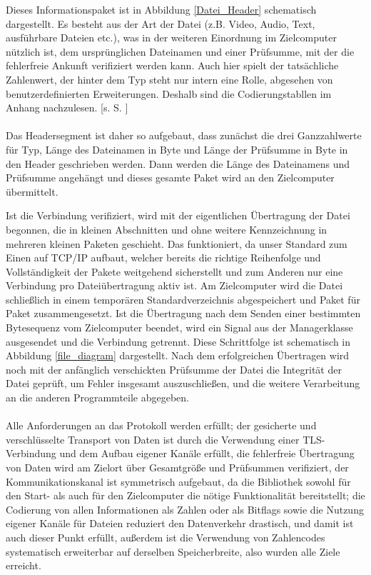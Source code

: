 Dieses Informationspaket ist in Abbildung \ref{Datei_Header} schematisch dargestellt.
Es besteht aus der Art der Datei (z.B. Video, Audio, Text, ausführbare Dateien etc.), was in der weiteren Einordnung im Zielcomputer nützlich ist, dem ursprünglichen Dateinamen und einer Prüfsumme, mit der die fehlerfreie Ankunft verifiziert werden kann. Auch hier spielt der tatsächliche Zahlenwert, der hinter dem Typ steht nur intern eine Rolle, abgesehen von benutzerdefinierten Erweiterungen. Deshalb sind die Codierungstabllen im Anhang nachzulesen. [s. S. \pageref{enums}]\\\\
Das Headersegment ist daher so aufgebaut, dass zunächst die drei Ganzzahlwerte für Typ, Länge des Dateinamen in Byte und Länge der Prüfsumme in Byte in den Header geschrieben werden. 
Dann werden die Länge des Dateinamens und Prüfsumme angehängt und dieses gesamte Paket wird an den Zielcomputer übermittelt.\par
Ist die Verbindung verifiziert, wird mit der eigentlichen Übertragung der Datei begonnen, die in kleinen Abschnitten und ohne weitere Kennzeichnung in mehreren kleinen Paketen geschieht.
Das funktioniert, da unser Standard zum Einen auf TCP/IP aufbaut, welcher bereits die richtige Reihenfolge und Vollständigkeit der Pakete weitgehend sicherstellt und zum Anderen nur eine Verbindung pro Dateiübertragung aktiv ist.
Am Zielcomputer wird die Datei schließlich in einem temporären Standardverzeichnis abgespeichert und Paket für Paket zusammengesetzt.
Ist die Übertragung nach dem Senden einer bestimmten Bytesequenz vom Zielcomputer beendet, wird ein Signal aus der Managerklasse ausgesendet und die Verbindung getrennt.
Diese Schrittfolge ist schematisch in Abbildung \ref{file_diagram} dargestellt.
Nach dem erfolgreichen Übertragen wird noch mit der anfänglich verschickten Prüfsumme der Datei die Integrität der Datei geprüft, um Fehler insgesamt auszuschließen, und die weitere Verarbeitung an die anderen Programmteile abgegeben.\\\\
Alle Anforderungen an das Protokoll werden erfüllt; der gesicherte und verschlüsselte Transport von Daten ist durch die Verwendung einer TLS-Verbindung und dem Aufbau eigener Kanäle erfüllt, die fehlerfreie Übertragung von Daten wird am Zielort über Gesamtgröße und Prüfsummen verifiziert, der Kommunikationskanal ist symmetrisch aufgebaut, da die Bibliothek sowohl für den Start- als auch für den Zielcomputer die nötige Funktionalität bereitstellt; die Codierung von allen Informationen als Zahlen oder als Bitflags sowie die Nutzung eigener Kanäle für Dateien reduziert den Datenverkehr drastisch, und damit ist auch dieser Punkt erfüllt, außerdem ist die Verwendung von Zahlencodes systematisch erweiterbar auf derselben Speicherbreite, also wurden alle Ziele erreicht.

